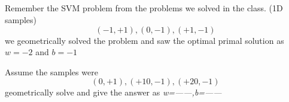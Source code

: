 \begin{frame}
\section{}
Remember the SVM problem from the problems we solved in the class. (1D samples)
\[ (-1,+1), (0,-1), (+1,-1) \]
we geometrically solved the problem and saw the optimal primal solution as $w=-2$ and $b=-1$

Assume the samples were
\[ (0,+1), (+10,-1), (+20,-1) \]
geometrically solve and give the answer as \textit{w=------,b=------}

\end{frame}
